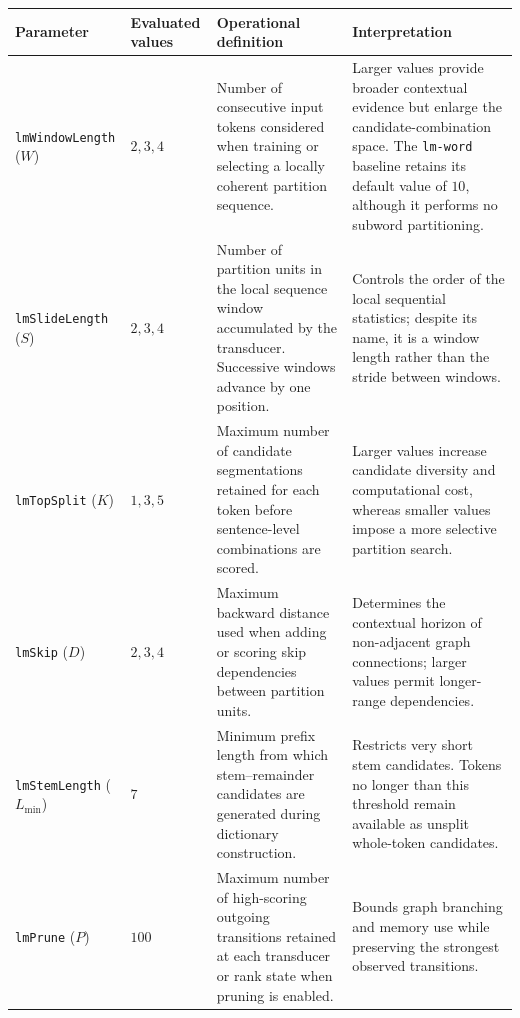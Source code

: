 \begin{table}[t]
  \centering
  \small
  \begin{tabular}{
    p{}
    p{}
    p{}
    p{}
  }
    \hline
    Parameter & Evaluated values & Operational definition &
    Interpretation \\
    \hline
    \texttt{lmWindowLength} ($W$)
    & $2,3,4$
    & Number of consecutive input tokens considered when training or
      selecting a locally coherent partition sequence.
    & Larger values provide broader contextual evidence but enlarge the
      candidate-combination space. The \texttt{lm-word} baseline retains its
      default value of $10$, although it performs no subword partitioning.
      \\

    \texttt{lmSlideLength} ($S$)
    & $2,3,4$
    & Number of partition units in the local sequence window accumulated by
      the transducer. Successive windows advance by one position.
    & Controls the order of the local sequential statistics; despite its
      name, it is a window length rather than the stride between windows.
      \\

    \texttt{lmTopSplit} ($K$)
    & $1,3,5$
    & Maximum number of candidate segmentations retained for each token
      before sentence-level combinations are scored.
    & Larger values increase candidate diversity and computational cost,
      whereas smaller values impose a more selective partition search.
      \\

    \texttt{lmSkip} ($D$)
    & $2,3,4$
    & Maximum backward distance used when adding or scoring skip
      dependencies between partition units.
    & Determines the contextual horizon of non-adjacent graph connections;
      larger values permit longer-range dependencies.
      \\

    \texttt{lmStemLength} ($L_{\min}$)
    & $7$
    & Minimum prefix length from which stem--remainder candidates are
      generated during dictionary construction.
    & Restricts very short stem candidates. Tokens no longer than this
      threshold remain available as unsplit whole-token candidates.
      \\

    \texttt{lmPrune} ($P$)
    & $100$
    & Maximum number of high-scoring outgoing transitions retained at each
      transducer or rank state when pruning is enabled.
    & Bounds graph branching and memory use while preserving the strongest
      observed transitions.
      \\


\end{tabular}
\end{table}
